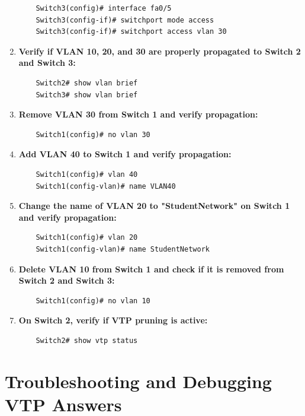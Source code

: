 \documentclass[a4paper]{book}
\begin{document}
\begin{enumerate}
\begin{lstlisting}
    Switch3(config)# interface fa0/5
    Switch3(config-if)# switchport mode access
    Switch3(config-if)# switchport access vlan 30
    \end{lstlisting}

    \item \textbf{Verify if VLAN 10, 20, and 30 are properly propagated to Switch 2 and Switch 3:}
    \begin{lstlisting}
    Switch2# show vlan brief
    Switch3# show vlan brief
    \end{lstlisting}

    \item \textbf{Remove VLAN 30 from Switch 1 and verify propagation:}
    \begin{lstlisting}
    Switch1(config)# no vlan 30
    \end{lstlisting}

    \item \textbf{Add VLAN 40 to Switch 1 and verify propagation:}
    \begin{lstlisting}
    Switch1(config)# vlan 40
    Switch1(config-vlan)# name VLAN40
    \end{lstlisting}

    \item \textbf{Change the name of VLAN 20 to "StudentNetwork" on Switch 1 and verify propagation:}
    \begin{lstlisting}
    Switch1(config)# vlan 20
    Switch1(config-vlan)# name StudentNetwork
    \end{lstlisting}

    \item \textbf{Delete VLAN 10 from Switch 1 and check if it is removed from Switch 2 and Switch 3:}
    \begin{lstlisting}
    Switch1(config)# no vlan 10
    \end{lstlisting}

    \item \textbf{On Switch 2, verify if VTP pruning is active:}
    \begin{lstlisting}
    Switch2# show vtp status
    \end{lstlisting}
\end{enumerate}

\section{Troubleshooting and Debugging VTP Answers}
\end{document}
